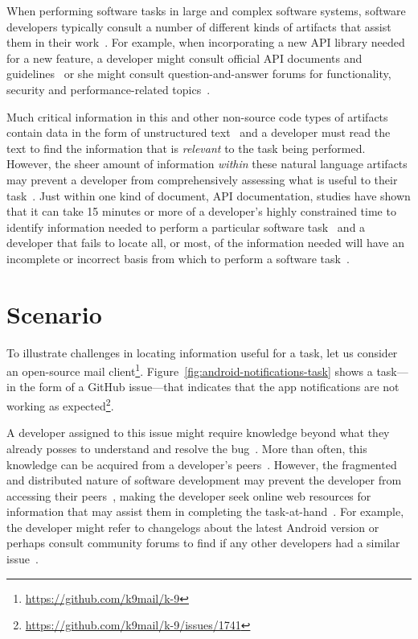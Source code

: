 

When performing software tasks in large and complex software systems, software developers typically consult a number of different kinds of artifacts that assist them in their work~\cite{Starke2009, Meyer2017}. For example, 
when incorporating a new API library needed for a new feature, a developer might consult official API documents and guidelines~\cite{robillard2011field, umarji2008archetypal} or she might consult question-and-answer forums for functionality, security and performance-related topics~\cite{parnin2012, silva2019}.



Much critical information in this and other non-source code types of artifacts 
contain data in the form of unstructured text~\cite{Bavota2016} and 
a developer must read the text to find the information that is \textit{relevant} to the task being performed.
However, the sheer amount of information \textit{within} these natural language artifacts may prevent a developer from comprehensively assessing what is useful to their task~\cite{Murphy2005}.  Just within one kind of document, API
documentation, studies have shown that it can take 15 minutes or more
of a developer's highly constrained time to identify 
information needed to perform a particular software task~\cite{endrikat2014, Meyer2017}
and a developer that fails to locate all, or most, of the information needed
 will have an incomplete or incorrect basis from which to perform a software task~\cite{Murphy2005}.





\section{Scenario}
\label{cp1:example}




To illustrate challenges in locating information useful for a task, let us consider an open-source mail client\footnote{\url{https://github.com/k9mail/k-9}}.
Figure~\ref{fig:android-notifications-task} shows a task---in the form of a GitHub issue---that indicates that the app notifications 
are not working as expected\footnote{\url{https://github.com/k9mail/k-9/issues/1741}}. 


A developer assigned to this issue might require knowledge beyond what they already posses to understand and resolve the bug~\cite{ko2007, Li2013, sillito2006}. 
More than often, this knowledge can be acquired from a developer's peers~\cite{singer2011}. 
However, the fragmented and distributed nature of software development  
may prevent the developer from accessing their peers~\cite{ko2007},
making the developer seek online web resources for information 
that may assist them in completing the task-at-hand~\cite{Xia2017, rao2020}.
For example, the developer might refer to changelogs 
about the latest Android version or perhaps
consult community forums to find if any other developers had a similar issue~\cite{parnin2012}. 


